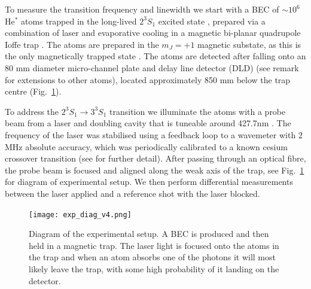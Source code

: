 \documentclass[%
 reprint,
 amsmath,amssymb,
 aps,
 prl,
]{revtex4-2}
\newcommand{\brycecom}[1]{{\color{ProcessBlue}[{#1}]\normalcolor}} %
\newcommand{\UpperState}{3^{3\!}S_1}%
\newcommand{\MetastableState}{2^{3\!}S_1}%
\begin{document}
To measure the transition frequency and linewidth we start with a BEC of \(\sim\)\(10^6\) He\(^*\) atoms trapped in the long-lived \(\MetastableState\) excited state \cite{PhysRevLett.103.053002}, prepared via a combination of laser and evaporative cooling in a magnetic bi-planar quadrupole Ioffe trap \cite{Dall2007}. The atoms are prepared in the \(m_J=+1\) magnetic substate, as this is the only magnetically trapped state \cite{Dall2007}. The atoms are detected after falling onto an 80 mm diameter micro-channel plate and delay line detector (DLD) \cite{Manning:10} (see remark \cite{detection_note} for extensions to other atoms), located approximately 850 mm below the trap centre (Fig.~\ref{fig:exp_setup}). 

To address the \(\MetastableState \rightarrow \UpperState\) transition we illuminate the atoms with a probe beam from a laser and doubling cavity that is tuneable around 427.7nm \cite{SOMs}.  The frequency of the laser was stabilised using a feedback loop to a wavemeter with \(2\) MHz absolute accuracy, which was periodically calibrated to a known cesium crossover transition (see \cite{SOMs} for further detail). After passing through an optical fibre, the probe beam is focused and aligned along the weak axis of the trap, see Fig.~\ref{fig:exp_setup} for diagram of experimental setup. We then perform differential measurements between the laser applied and a reference shot with the laser blocked.

\begin{figure}[t]
\texttt{[image: exp\_diag\_v4.png]}%
\caption{\label{fig:exp_setup}Diagram of the experimental setup. A BEC is produced and then held in a magnetic trap. The laser light is focused onto the atoms in the trap and when an atom absorbs one of the photons it will most likely leave the trap, with some high probability of it landing on the detector.}
\end{figure}
\end{document}
